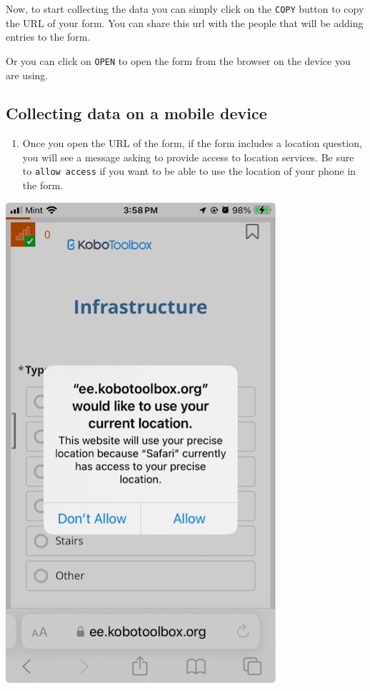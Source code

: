 \documentclass[
  letterpaper,
  DIV=11,
  numbers=noendperiod]{scrartcl}
\providecommand{\tightlist}{%
  \setlength{\itemsep}{0pt}\setlength{\parskip}{0pt}}\usepackage{longtable,booktabs,array}
\begin{document}
Now, to start collecting the data you can simply click on the
\texttt{COPY} button to copy the URL of your form. You can share this
url with the people that will be adding entries to the form.

Or you can click on \texttt{OPEN} to open the form from the browser on
the device you are using.

\subsection{Collecting data on a mobile
device}\label{collecting-data-on-a-mobile-device}

\begin{enumerate}
\def\labelenumi{\arabic{enumi}.}
\tightlist
\item
  Once you open the URL of the form, if the form includes a location
  question, you will see a message asking to provide access to location
  services. Be sure to \texttt{allow\ access} if you want to be able to
  use the location of your phone in the form.
\end{enumerate}

\includegraphics{kobotoolbox_tutorial_files/img/img15.jpg}
\end{document}
